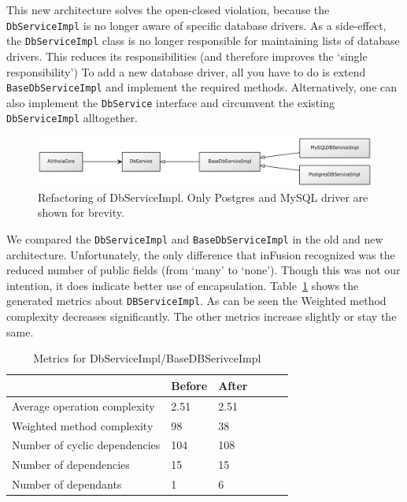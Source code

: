 \documentclass{article}
\begin{document}
This new architecture solves the open-closed violation, because the \texttt{DbServiceImpl} is no longer aware of specific database drivers. As a side-effect, the \verb|DbServiceImpl| class is no longer responsible for maintaining lists of database drivers. This reduces its responsibilities (and therefore improves the `single responsibility') To add a new database driver, all you have to do is extend \verb|BaseDbServiceImpl| and implement the required methods. Alternatively, one can also implement the \verb|DbService| interface and circumvent the existing \texttt{DbServiceImpl} alltogether.

\begin{figure}[h]
    \centering
    \includegraphics[width=1\textwidth]{dbs}
    \caption{Refactoring of DbServiceImpl. Only Postgres and MySQL driver are shown for brevity.}
    \label{fig:dbs}
\end{figure}

We compared the \verb|DbServiceImpl| and \verb|BaseDbServiceImpl| in the old and new architecture. Unfortunately, the only difference that inFusion recognized was the reduced number of public fields (from `many' to `none'). Though this was not our intention, it does indicate better use of encapsulation. Table~\ref{tbl:dbservice} shows the generated metrics about \verb|DBServiceImpl|. As can be seen the Weighted method complexity decreases significantly. The other metrics increase slightly or stay the same. 

\begin{table}[h]
	\centering
    \begin{tabular}{l|llll}
    ~                                 & Before & After & ~ & ~ \\ \hline
    Average operation complexity      & 2.51 & 2.51 \\
    Weighted method complexity        & 98   & 38 \\
    Number of cyclic dependencies     & 104  & 108 \\
    Number of dependencies            & 15   & 15  \\
    Number of dependants              & 1    & 6   \\
    \end{tabular}
    \caption{Metrics for DbServiceImpl/BaseDBSerivceImpl}
    \label{tbl:dbservice}
\end{table}
\end{document}
